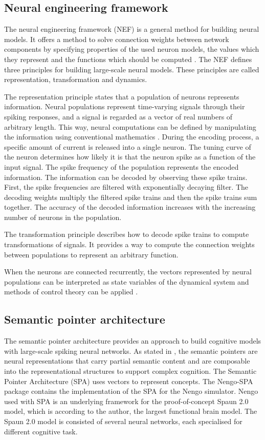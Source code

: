 \subsection{Neural engineering framework}
The neural engineering framework (NEF) is a general method for building neural models. It offers a method to solve connection weights between network components by specifying properties of the used neuron models, the values which they represent and the functions which should be computed \cite{stewartTechnicalOverviewNeural2012}. The NEF defines three principles for building large-scale neural models. These principles are called representation, transformation and dynamics. \par
The representation principle states that a population of neurons represents information. Neural populations represent time-varying signals through their spiking responses, and a signal is regarded as a vector of real numbers of arbitrary length.  This way, neural computations can be defined by manipulating the information using conventional mathematics \cite{bekolayNengoPythonTool2014}. During the encoding process, a specific amount of current is released into a single neuron. The tuning curve of the neuron determines how likely it is that the neuron spike as a function of the input signal. The spike frequency of the population represents the encoded information. The information can be decoded by observing these spike trains. First, the spike frequencies are filtered with exponentially decaying filter. The decoding weights multiply the filtered spike trains and then the spike trains sum together. The accuracy of the decoded information increases with the increasing number of neurons in the population. \par
The transformation principle describes how to decode spike trains to compute transformations of signals. It provides a way to compute the connection weights between populations to represent an arbitrary function. \par
When the neurons are connected recurrently, the vectors represented by neural populations can be interpreted as state variables of the dynamical system and methods of control theory can be applied \cite{bekolayNengoPythonTool2014}.

\subsection{Semantic pointer architecture}
The semantic pointer architecture provides an approach to build cognitive models with large-scale spiking neural networks. As stated in \cite{eliasmithHowBuild13}, the semantic pointers are neural representations that carry partial semantic content and are composable into the representational structures to support complex cognition. The Semantic Pointer Architecture (SPA) uses vectors to represent concepts. The Nengo-SPA package contains the implementation of the SPA for the Nengo simulator. Nengo used with SPA is an underlying framework for the proof-of-concept Spaun 2.0 \cite{chooSpaunExtending18} model, which is according to the author, the largest functional brain model. The Spaun 2.0 model is consisted of several neural networks, each specialised for different cognitive task.

